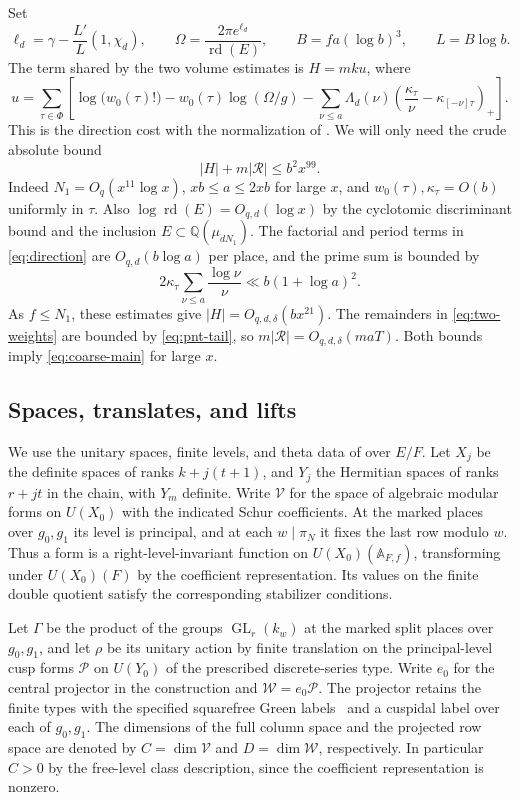 \documentclass[11pt,reqno]{amsart}
\theoremstyle{definition}
\numberwithin{equation}{section}
\newcommand{\QQ}{\mathbb Q}
\newcommand{\rd}{\operatorname{rd}}
\begin{document}
Set
\[
 \ell_d=\gamma-\frac{L'}{L}(1,\chi_d),\qquad
 \Omega=\frac{2\pi e^{\ell_d}}{\rd(E)},\qquad
 B=fa(\log b)^3,\qquad L=B\log b.
\]
The term shared by the two volume estimates is \(H=mku\), where
\begin{equation}\label{eq:direction}
 u=\sum_{\tau\in\Phi}\left[
  \log\bigl(w_0(\tau)!\bigr)-w_0(\tau)\log(\Omega/g)
  -\sum_{\nu\le a}\Lambda_d(\nu)
          \left(\frac{\kappa_\tau}{\nu}-\kappa_{[-\nu]\tau}\right)_+
 \right].
\end{equation}
This is the direction cost with the normalization
of \cite[{\rm(3.8)}]{chojecki}.
We will only need the crude absolute bound
\begin{equation}\label{eq:coarse-main}
 |H|+m|\mathcal R|\le b^2x^{99}.
\end{equation}
Indeed \(N_1=O_q(x^{11}\log x)\), \(xb\le a\le 2xb\) for
large \(x\), and \(w_0(\tau),\kappa_\tau=O(b)\) uniformly in
\(\tau\). Also \(\log\rd(E)=O_{q,d}(\log x)\) by the cyclotomic
discriminant bound and the inclusion \(E\subset\QQ(\mu_{dN_1})\).
The factorial and period terms in \eqref{eq:direction} are
\(O_{q,d}(b\log a)\) per place, and the prime sum is bounded by
\[
 2\kappa_\tau\sum_{\nu\le a}\frac{\log\nu}{\nu}
       \ll b(1+\log a)^2 .
\]
As \(f\le N_1\), these estimates give \(|H|=O_{q,d,\delta}(bx^{21})\).
The remainders in \eqref{eq:two-weights} are bounded by
\eqref{eq:pnt-tail}, so \(m|\mathcal R|=O_{q,d,\delta}(maT)\).
Both bounds imply \eqref{eq:coarse-main} for large \(x\).

\subsection{Spaces, translates, and lifts}

We use the unitary spaces, finite levels, and theta data of
\cite[\S\S4--6 and Theorem~20.16]{chojecki} over \(E/F\).
Let \(X_j\) be the definite spaces of ranks \(k+j(t+1)\), and
\(Y_j\) the Hermitian spaces of ranks \(r+jt\) in the chain,
with \(Y_m\) definite. Write \(\mathcal V\) for the space of
algebraic modular forms on \(U(X_0)\) with the indicated Schur
coefficients. At the marked places over \(g_0,g_1\) its level is
principal, and at each \(w\mid\pi_N\) it fixes the last row modulo
\(w\). Thus a form is a right-level-invariant function on
\(U(X_0)(\mathbb A_{F,f})\), transforming under \(U(X_0)(F)\) by
the coefficient representation. Its values on the finite double
quotient satisfy the corresponding stabilizer conditions.

Let \(\Gamma\) be the product of the groups
\(\operatorname{GL}_r(k_w)\) at the marked split places over
\(g_0,g_1\), and let \(\rho\) be its unitary action by finite
translation on the principal-level cusp forms \(\mathcal P\)
on \(U(Y_0)\) of the prescribed discrete-series type. Write \(e_0\)
for the central projector in the construction and
\(\mathcal W=e_0\mathcal P\). The projector retains the finite
types with the specified squarefree Green labels~\cite{green} and a
cuspidal label over each of \(g_0,g_1\).
The dimensions of the full column space and the projected row
space are denoted by \(C=\dim\mathcal V\) and \(D=\dim\mathcal W\),
respectively. In particular \(C>0\) by the free-level class
description, since the coefficient representation is nonzero.
\end{document}
